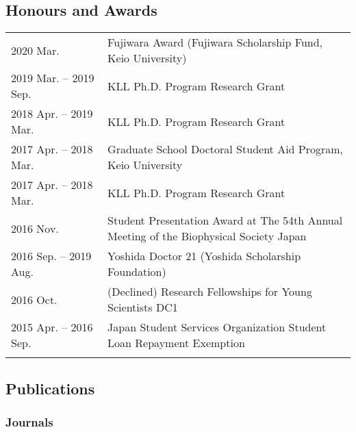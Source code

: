 \documentclass[12pt,]{scrartcl}
\begin{document}
\subsection{Honours and
Awards}\label{selected-honours-and-awards}

\begin{table}[!h]
{\def\arraystretch{1.5}\tabcolsep=0pt
\begin{tabular}{p{0.28\linewidth}p{0.75\linewidth}}
    2020 Mar. & Fujiwara Award (Fujiwara Scholarship Fund, Keio University)\\
    2019 Mar. -- 2019 Sep. & KLL Ph.D. Program Research Grant\\
    2018 Apr. -- 2019 Mar. & KLL Ph.D. Program Research Grant\\
    2017 Apr. -- 2018 Mar. & Graduate School Doctoral Student Aid Program, Keio University\\
    2017 Apr. -- 2018 Mar. & KLL Ph.D. Program Research Grant\\
    2016 Nov. & Student Presentation Award at The 54th Annual Meeting of the Biophysical Society Japan\\
    2016 Sep. -- 2019 Aug. & Yoshida Doctor 21 (Yoshida Scholarship Foundation)\\
    2016 Oct. & (Declined) Research Fellowships for Young Scientists DC1\\
    2015 Apr. -- 2016 Sep. & Japan Student Services Organization Student Loan Repayment Exemption\\
\\
\end{tabular}%
}
\end{table}

\subsection{Publications}\label{publications}
\subsubsection{Journals}\label{journals}
\end{document}
